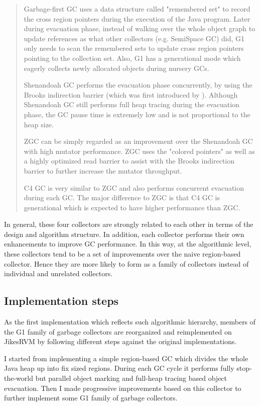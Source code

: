 \begin{quote}
  Garbage-first GC uses a data structure called "remembered set" to record the
  cross region pointers during the execution of the Java program.
  Later during evacuation phase, instead of walking over the whole object graph to update
  references as what other collectors (e.g. SemiSpace GC) did, G1 only needs to scan the
  remembered sets to update cross region pointers pointing to the collection set.
  Also, G1 has a generational mode which eagerly collects newly allocated objects
  during nursery GCs.

  Shenandoah GC performs the evacuation phase concurrently, by using the
  Brooks indirection barrier (which was first introduced by \cite{brooks1984trading}).
  Although Shenandoah GC still performs full heap tracing during the evacuation phase,
  the GC pause time is extremely low and is not proportional to the heap size.

  ZGC can be simply regarded as an improvement over the Shenandoah GC with high mutator performance.
  ZGC uses the "colored pointers"
  as well as a highly optimized read barrier to assist with the Brooks indirection barrier
  to further increase the mutator throughput.

  C4 GC is very similar to ZGC and also performs concurrent evacuation during each
  GC. The major difference to ZGC is that C4 GC is generational which is expected
  to have higher performance than ZGC.
\end{quote}

In general, these four collectors are strongly related to each other in terms of
the design and algorithm structure. In addition, each collector performs their
own enhancements to improve GC performance. In this way, at the algorithmic level,
these collectors tend to be a set of improvements over the naive region-based collector.
Hence they are more likely to form as a family of collectors
instead of individual and unrelated collectors.

\subsection{Implementation steps}

As the first implementation which reflects such algorithmic hierarchy,
members of the G1 family of garbage collectors are reorganized and reimplemented on JikesRVM
by following different steps against the original implementations. 

I started from implementing a simple region-based GC which divides the whole Java heap
up into fix sized regions. During each GC cycle it performs fully stop-the-world but parallel object marking
and full-heap tracing based object evacuation.
Then I made progressive improvements based on this collector to further implement some G1 family of garbage collectors.

